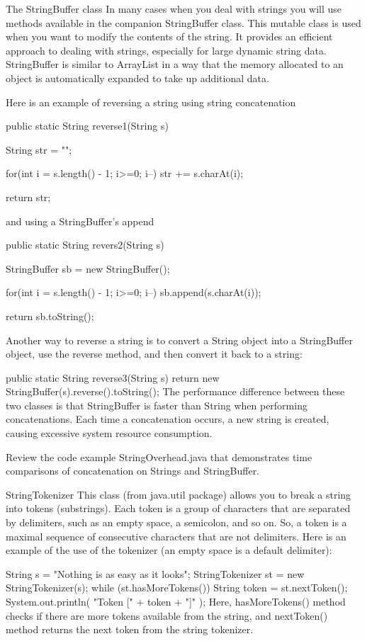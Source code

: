 The StringBuffer class
In many cases when you deal with strings you will use methods available in the companion StringBuffer class. This mutable class is used when you want to modify the contents of the string. It provides an efficient approach to dealing with strings, especially for large dynamic string data. StringBuffer is similar to ArrayList in a way that the memory allocated to an object is automatically expanded to take up additional data.

Here is an example of reversing a string using string concatenation

public static String reverse1(String s)
{
   String str = "";

   for(int i = s.length() - 1; i>=0; i--)
      str += s.charAt(i);

   return str;
}
and using a StringBuffer's append

public static String revers2(String s)
{
   StringBuffer sb = new StringBuffer();

   for(int i = s.length() - 1; i>=0; i--)
      sb.append(s.charAt(i));

   return sb.toString();
}
Another way to reverse a string is to convert a String object into a StringBuffer object, use the reverse method, and then convert it back to a string:

public static String reverse3(String s)
{
   return new StringBuffer(s).reverse().toString();
}
The performance difference between these two classes is that StringBuffer is faster than String when performing concatenations. Each time a concatenation occurs, a new string is created, causing excessive system resource consumption.

Review the code example StringOverhead.java that demonstrates time comparisons of concatenation on Strings and StringBuffer.

StringTokenizer
This class (from java.util package) allows you to break a string into tokens (substrings). Each token is a group of characters that are separated by delimiters, such as an empty space, a semicolon, and so on. So, a token is a maximal sequence of consecutive characters that are not delimiters. Here is an example of the use of the tokenizer (an empty space is a default delimiter):

String s = "Nothing is as easy as it looks";
StringTokenizer st = new StringTokenizer(s);
while (st.hasMoreTokens())
{
    String token = st.nextToken();
    System.out.println( "Token [" + token + "]" );
}
Here, hasMoreTokens() method checks if there are more tokens available from the string, and nextToken() method returns the next token from the string tokenizer.


